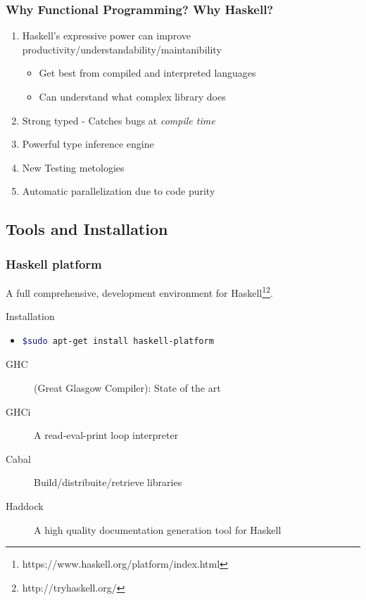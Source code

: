 \begin{frame}\frametitle{Why Functional Programming? Why Haskell?} 
		\begin{enumerate}
		  \item Haskell's expressive power can improve
		  productivity/understandability/maintanibility
				\begin{itemize}
			    \item Get best from compiled and interpreted languages
			    \item Can understand what complex library does
			  \end{itemize}
		\item Strong typed - Catches bugs at \emph{compile time}
		\item Powerful type inference engine
		\item New Testing metologies
		\item Automatic parallelization due to code purity
		\end{enumerate}
	\end{frame}
	
	\subsection{Tools and Installation}
		\begin{frame}[fragile]\frametitle{Haskell platform}
		A full comprehensive, development environment for
		Haskell\footnote{https://www.haskell.org/platform/index.html}\footnote{http://tryhaskell.org/}.
		
			\begin{block}{Installation}
			\begin{itemize}
			  \item 
				\begin{lstlisting}[language=bash]
					$sudo apt-get install haskell-platform
				\end{lstlisting}
			\end{itemize}
			\end{block}
			
			\begin{description}
			  \item[GHC]
			  	 (Great Glasgow Compiler): State of the art
			  \item[GHCi]
			  	 A read-eval-print loop interpreter
			  \item[Cabal]
			   	Build/distribuite/retrieve libraries
			  \item[Haddock]
			   		A high quality documentation generation tool for Haskell 
			\end{description}
\end{frame}

